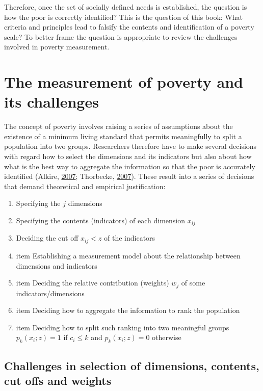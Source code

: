 \documentclass[]{book}
\providecommand{\tightlist}{%
  \setlength{\itemsep}{0pt}\setlength{\parskip}{0pt}}
\begin{document}
Therefore, once the set of socially defined needs is established, the question is how the poor is correctly identified? This is the question of this book: What criteria and principles lead to falsify the contents and identification of a poverty scale? To better frame the question is appropriate to review the challenges involved in poverty measurement.

\hypertarget{the-measurement-of-poverty-and-its-challenges}{%
\section{The measurement of poverty and its challenges}\label{the-measurement-of-poverty-and-its-challenges}}

The concept of poverty involves raising a series of assumptions about the existence of a minimum living standard that permits meaningfully to split a population into two groups. Researchers therefore have to make several decisions with regard how to select the dimensions and its indicators but also about how what is the best way to aggregate the information so that the poor is accurately identified (Alkire, \protect\hyperlink{ref-Alkire2007}{2007}; Thorbecke, \protect\hyperlink{ref-Thorbecke2007}{2007}). These result into a series of decisions that demand theoretical and empirical justification:

\begin{enumerate}
\def\labelenumi{\arabic{enumi}.}
\tightlist
\item
  Specifying the \(j\) dimensions
\item
  Specifying the contents (indicators) of each dimension \(x_{ij}\)
\item
  Deciding the cut off \(x_{ij}<z\) of the indicators
\item
  item Establishing a measurement model about the relationship between dimensions and indicators
\item
  item Deciding the relative contribution (weights) \(w_{j}\) of some indicators/dimensions
\item
  item Deciding how to aggregate the information to rank the population
\item
  item Deciding how to split such ranking into two meaningful groups \(p_k (x_i;z) = 1\) if \(c_i\leq k\) and \(p_k (x_i;z) = 0\) otherwise
\end{enumerate}

\hypertarget{challenges-in-selection-of-dimensions-contents-cut-offs-and-weights}{%
\subsection{Challenges in selection of dimensions, contents, cut offs and weights}\label{challenges-in-selection-of-dimensions-contents-cut-offs-and-weights}}
\end{document}

